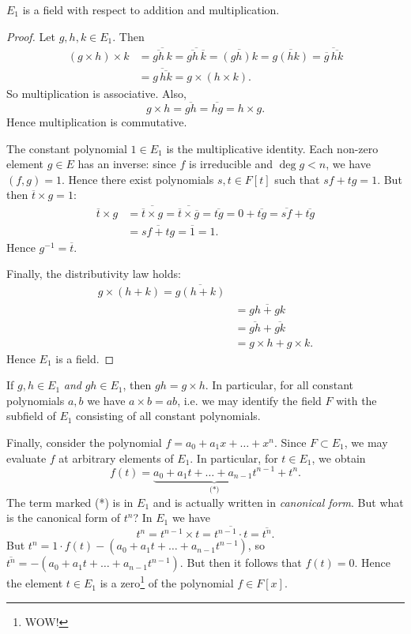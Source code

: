 \begin{proposition}
	$E_1$ is a field with respect to addition and multiplication.
	\begin{proof}
		Let $g, h, k \in E_1$. Then
		\begin{align*}
			(g \times h) \times k &= \overline{\overline{gh}\,k} = \overline{\overline{gh}\,\overline{k}} = \overline{(gh)k} = \overline{g(hk)} = \overline{\overline{g}\,\overline{hk}} \\
					&= \overline{g\,\overline{hk}} = g \times (h \times k).
		\end{align*}
		So multiplication is associative. Also,
		\[
			g \times h = \overline{gh} = \overline{hg} = h \times g.
		\]
		Hence multiplication is commutative.
		
		The constant polynomial $1 \in E_1$ is the multiplicative identity. Each non-zero element $g \in E$ has an inverse: since $f$ is irreducible and $\deg{g} < n$, we have $(f, g) = 1$. Hence there exist polynomials $s, t \in F[t]$ such that $sf + tg = 1$. But then $\overline{t} \times g = 1$:
		\begin{align*}
			\overline{t} \times g &= \overline{\overline{t} \times g} = \overline{\overline{t} \times \overline{g}} = \overline{tg} = 0 + \overline{tg} = \overline{sf} + \overline{tg} \\
					&= \overline{sf + tg} = \overline{1} = 1.
		\end{align*}
		Hence $g^{-1} = \overline{t}$.
		
		Finally, the distributivity law holds:
		\begin{align*}
			g \times (h + k) = \overline{g(h + k)} \\
					&= \overline{gh + gk} \\
					&= \overline{gh} + \overline{gk} \\
					&= g \times h + g \times k.
		\end{align*}
		Hence $E_1$ is a field.
	\end{proof}
\end{proposition}

\begin{note}
	If $g, h \in E_1$ \emph{and} $gh \in E_1$, then $gh = g \times h$. In particular, for all constant polynomials $a, b$ we have $a \times b = ab$, i.e. we may identify the field $F$ with the subfield of $E_1$ consisting of all constant polynomials.
\end{note}

Finally, consider the polynomial $f = a_0 + a_1 x + \dots + x^n$. Since $F \subset E_1$, we may evaluate $f$ at arbitrary elements of $E_1$. In particular, for $t \in E_1$, we obtain
\[
	f(t) = \underbrace{a_0 + a_1 t + \dots + a_{n - 1} t^{n - 1}}_{\text{(*)}} + t^n.
\]
The term marked (*) is in $E_1$ and is actually written in \emph{canonical form}. But what is the canonical form of $t^n$? In $E_1$ we have
\[
	t^n = t^{n - 1} \times t = \overline{t^{n - 1} \cdot t} = \overline{t^n}.
\]
But $t^n = 1 \cdot f(t) - (a_0 + a_1 t + \dots + a_{n - 1} t^{n - 1})$, so $\overline{t^n} = -(a_0 + a_1 t + \dots + a_{n - 1} t^{n - 1})$. But then it follows that $f(t) = 0$. Hence the element $t \in E_1$ is a zero\footnote{WOW!} of the polynomial $f \in F[x]$.


